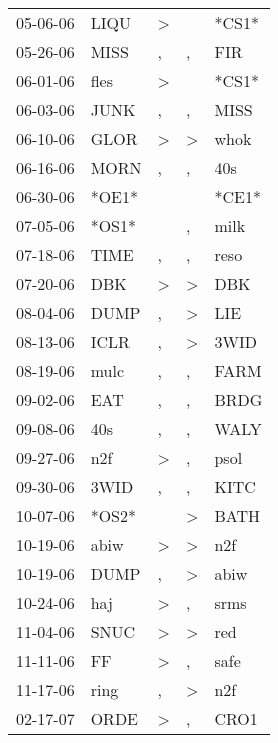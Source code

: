 \begin{supertabular}{lllll}
 05-06-06 &   LIQU &  \textgreater &               &  *CS1* \\
 05-26-06 &   MISS &             , &             , &    FIR \\
 06-01-06 &   fles &  \textgreater &               &  *CS1* \\
 06-03-06 &   JUNK &             , &             , &   MISS \\
 06-10-06 &   GLOR &  \textgreater &  \textgreater &   whok \\
 06-16-06 &   MORN &             , &             , &    40s \\
 06-30-06 &  *OE1* &               &               &  *CE1* \\
 07-05-06 &  *OS1* &               &             , &   milk \\
 07-18-06 &   TIME &             , &             , &   reso \\
 07-20-06 &    DBK &  \textgreater &  \textgreater &    DBK \\
 08-04-06 &   DUMP &             , &  \textgreater &    LIE \\
 08-13-06 &   ICLR &             , &  \textgreater &   3WID \\
 08-19-06 &   mulc &             , &             , &   FARM \\
 09-02-06 &    EAT &             , &             , &   BRDG \\
 09-08-06 &    40s &             , &             , &   WALY \\
 09-27-06 &    n2f &  \textgreater &             , &   psol \\
 09-30-06 &   3WID &             , &             , &   KITC \\
 10-07-06 &  *OS2* &               &  \textgreater &   BATH \\
 10-19-06 &   abiw &  \textgreater &  \textgreater &    n2f \\
 10-19-06 &   DUMP &             , &  \textgreater &   abiw \\
 10-24-06 &    haj &  \textgreater &             , &   srms \\
 11-04-06 &   SNUC &  \textgreater &  \textgreater &    red \\
 11-11-06 &     FF &  \textgreater &             , &   safe \\
 11-17-06 &   ring &             , &  \textgreater &    n2f \\
 02-17-07 &   ORDE &  \textgreater &             , &   CRO1 \\

\end{supertabular}
